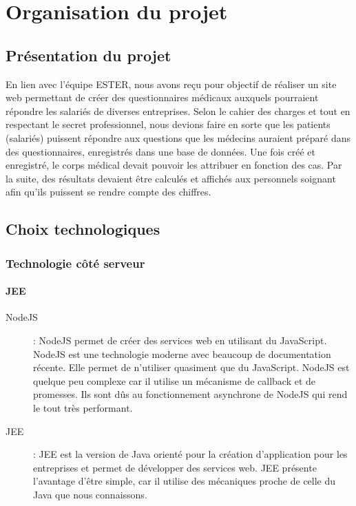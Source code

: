 \chapter{Organisation du projet}

\section{Présentation du projet}

En lien avec l'équipe ESTER, nous avons reçu pour objectif de réaliser un site web permettant de créer des questionnaires médicaux auxquels pourraient répondre les salariés de diverses entreprises. Selon le cahier des charges et tout en respectant le secret professionnel, nous devions faire en sorte que les patients (salariés) puissent répondre aux questions que les médecins auraient préparé dans des questionnaires, enregistrés dans une base de données. Une fois créé et enregistré, le corps médical devait pouvoir les attribuer en fonction des cas. Par la suite, des résultats devaient être calculés et affichés aux personnels soignant afin qu'ils puissent se rendre compte des chiffres. 

\section{Choix technologiques}

\subsection{Technologie côté serveur}

\subsubsection{JEE}

\begin{description}

\item[NodeJS] : NodeJS permet de créer des services web en utilisant du JavaScript. 
NodeJS est une technologie moderne avec beaucoup de documentation récente. Elle permet de n'utiliser quasiment que du JavaScript. NodeJS est quelque peu complexe car il utilise un mécanisme de callback et de promesses. Ils sont dûs au fonctionnement asynchrone de NodeJS qui rend le tout très performant.

\item[JEE] : JEE est la version de Java orienté pour la création d'application pour les entreprises et permet de développer des services web.
JEE présente l'avantage d'être simple, car il utilise des mécaniques proche de celle du Java que nous connaissons. 

\end{description}

